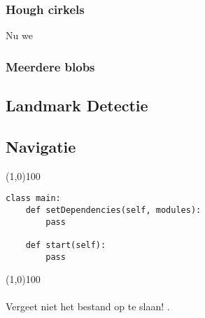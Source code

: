 \documentclass[a4paper]{article}
\begin{document}
\subsubsection{Hough cirkels}
Nu we 


\subsubsection{Meerdere blobs}


\subsection{Landmark Detectie}

\subsection{Navigatie}




\noindent \line(1,0){100}
\begin{verbatim}
class main:
    def setDependencies(self, modules):
        pass

    def start(self):
        pass
\end{verbatim}
\noindent \line(1,0){100}
\\\\
Vergeet niet het bestand op te slaan!
.
\end{document}
